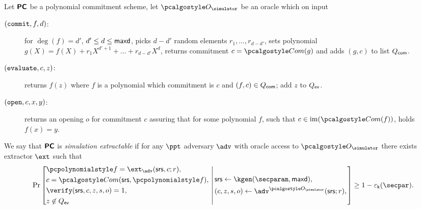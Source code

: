 \documentclass[runningheads,11pt]{llncs}
\begin{document}
\begin{definition}
  \label{def:sepcom}
  Let $\bm{\mathsf{PC}}$ be a polynomial commitment scheme, let $\oracles$ be an 
  oracle which on input
  \begin{description}
\item[$(\mathtt{commit}, f, d)$:] for $\deg(f) = d'$, $d' \leq d \leq \mathsf{maxd}$,
  picks $d - d'$ random elements $r_1, \ldots, r_{d - d'}$, sets 
  polynomial $g(X) = f(X) + r_1 X^{d' + 1} + \ldots + r_{d - d'} X^{d}$, returns
  commitment $c = \com(g)$ and adds $(g, c)$ to list $Q_{\mathsf{com}}$.
  \item[$(\mathtt{evaluate}, c, z)$:] returns $f(z)$ where $f$ is a polynomial
    which commitment is $c$ and $(f, c) \in Q_{\mathsf{com}}$; add $z$ to $Q_{\mathsf{ev}}$.
  \item[$(\mathtt{open}, c, x, y)$:] returns an opening $o$ for commitment $c$
    assuring that for some polynomial $f$, such that $c \in \image(\com(f))$,
    holds $f(x) = y$.
  \end{description}
  We say that $\bm{\mathsf{PC}}$ is \emph{simulation extractable} if for any $\ppt$
  adversary $\adv$ with oracle access to $\oracles$ there exists extractor
  $\ext$ such that
\[
  \Pr \left[
    \begin{aligned}
      & \p{f} = \ext_\adv(\srs, c; r),\\
      & c = \com(\srs, \p{f}),\\
      & \verify(\srs, c, z, s, o) = 1,\\
      & z \not\in \Qev
    \end{aligned}
    \,\left|\,
      \vphantom{
        \begin{aligned}
          & \\
          & \\
          & \\
          &
        \end{aligned}
        }
    \begin{aligned}
      & \srs \gets \kgen(\secparam, \maxdeg),\\
      & (c, z, s, o) \gets \adv^{\oracles}(\srs; r), \\
    \end{aligned}
  \right.\right]
  \geq 1 - \epsk(\secpar).
\]
 \end{definition}
\end{document}
